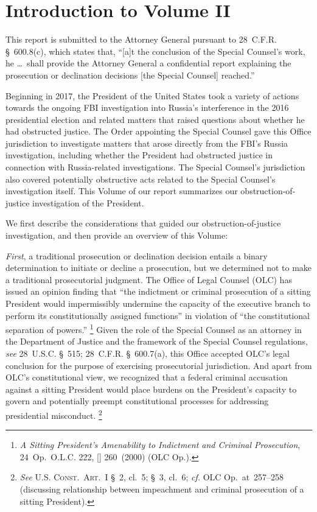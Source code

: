 \section*{Introduction to Volume II}
\label{sec:introduction-2}

This report is submitted to the Attorney General pursuant to 28~C.F.R. \S~600.8(c), which states that, ``[a]t the conclusion of the Special Counsel's work, he \dots\ shall provide the Attorney General a confidential report explaining the prosecution or declination decisions [the Special Counsel] reached.''

Beginning in 2017, the President of the United States took a variety of actions towards the ongoing FBI investigation into Russia's interference in the 2016 presidential election and related matters that raised questions about whether he had obstructed justice.
The Order appointing the Special Counsel gave this Office jurisdiction to investigate matters that arose directly from the FBI's Russia investigation, including whether the President had obstructed justice in connection with Russia-related investigations.
The Special Counsel's jurisdiction also covered potentially obstructive acts related to the Special Counsel's investigation itself.
This Volume of our report summarizes our obstruction-of-justice investigation of the President.

We first describe the considerations that guided our obstruction-of-justice investigation, and then provide an overview of this Volume:

\textit{First}, a traditional prosecution or declination decision entails a binary determination to initiate or decline a prosecution, but we determined not to make a traditional prosecutorial judgment.
The Office of Legal Counsel (OLC) has issued an opinion finding that ``the indictment or criminal prosecution of a sitting President would impermissibly undermine the capacity of the executive branch to perform its constitutionally assigned functions'' in violation of ``the constitutional separation of powers.''%
\footnote{\textit{A Sitting President's Amenability to Indictment and Criminal Prosecution}, 24~Op.\ O.L.C. 222, [] 260~(2000) (OLC Op.).}
Given the role of the Special Counsel as an attorney in the Department of Justice and the framework of the Special Counsel regulations, \textit{see} 28~U.S.C. \S~515; 28~C.F.R. \S~600.7(a), this Office accepted OLC's legal conclusion for the purpose of exercising prosecutorial jurisdiction.
And apart from OLC's constitutional view, we recognized that a federal criminal accusation against a sitting President would place burdens on the President's capacity to govern and potentially preempt constitutional processes for addressing presidential misconduct.%
\footnote{\textit{See} \textsc{U.S. Const.\ Art.~I} \S~2, cl.~5; \S~3, cl.~6; \textit{cf.} OLC Op.\ at~257--258 (discussing relationship between impeachment and criminal prosecution of a sitting President).}

